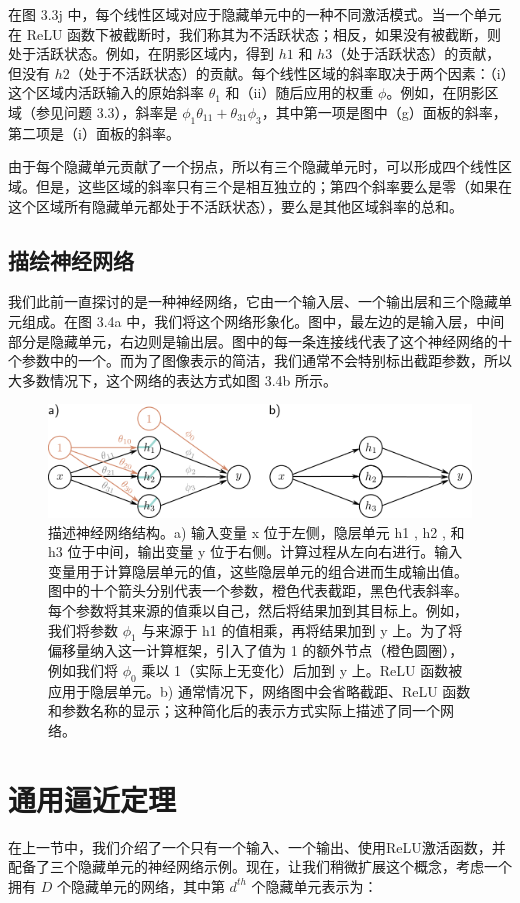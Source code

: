 在图 3.3j 中，每个线性区域对应于隐藏单元中的一种不同激活模式。当一个单元在 ReLU 函数下被截断时，我们称其为不活跃状态；相反，如果没有被截断，则处于活跃状态。例如，在阴影区域内，得到 \(h1\) 和 \(h3\)（处于活跃状态）的贡献，但没有 \(h2\)（处于不活跃状态）的贡献。每个线性区域的斜率取决于两个因素：（i）这个区域内活跃输入的原始斜率 \(\theta_1\) 和（ii）随后应用的权重 \(\phi\)。例如，在阴影区域（参见问题 3.3），斜率是 \(\phi_1\theta_{11} + \theta_{31}\phi_3\)，其中第一项是图中（g）面板的斜率，第二项是（i）面板的斜率。

由于每个隐藏单元贡献了一个拐点，所以有三个隐藏单元时，可以形成四个线性区域。但是，这些区域的斜率只有三个是相互独立的；第四个斜率要么是零（如果在这个区域所有隐藏单元都处于不活跃状态），要么是其他区域斜率的总和。
\subsection{描绘神经网络}
我们此前一直探讨的是一种神经网络，它由一个输入层、一个输出层和三个隐藏单元组成。在图 3.4a 中，我们将这个网络形象化。图中，最左边的是输入层，中间部分是隐藏单元，右边则是输出层。图中的每一条连接线代表了这个神经网络的十个参数中的一个。而为了图像表示的简洁，我们通常不会特别标出截距参数，所以大多数情况下，这个网络的表达方式如图 3.4b 所示。

\begin{figure}[ht!]
	\centering
	\includegraphics[width=0.7\linewidth]{png/chapter3/ShallowNet.png}
\caption{描述神经网络结构。a) 输入变量 x 位于左侧，隐层单元 h1 , h2 , 和 h3 位于中间，输出变量 y 位于右侧。计算过程从左向右进行。输入变量用于计算隐层单元的值，这些隐层单元的组合进而生成输出值。图中的十个箭头分别代表一个参数，橙色代表截距，黑色代表斜率。每个参数将其来源的值乘以自己，然后将结果加到其目标上。例如，我们将参数 \(\phi_1\) 与来源于 h1 的值相乘，再将结果加到 y 上。为了将偏移量纳入这一计算框架，引入了值为 1 的额外节点（橙色圆圈），例如我们将 \(\phi_0\) 乘以 1（实际上无变化）后加到 y 上。ReLU 函数被应用于隐层单元。b) 通常情况下，网络图中会省略截距、ReLU 函数和参数名称的显示；这种简化后的表示方式实际上描述了同一个网络。}
\end{figure}

\section{通用逼近定理}
在上一节中，我们介绍了一个只有一个输入、一个输出、使用ReLU激活函数，并配备了三个隐藏单元的神经网络示例。现在，让我们稍微扩展这个概念，考虑一个拥有 \(D\) 个隐藏单元的网络，其中第 \(d^{th}\) 个隐藏单元表示为：

